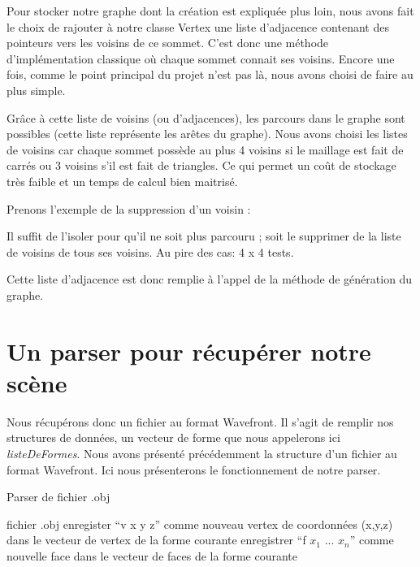 \documentclass[a4paper,12pt]{report}
\begin{document}
Pour stocker notre graphe dont la création est expliquée plus loin, nous avons fait le choix de rajouter à notre classe Vertex une liste d'adjacence contenant des pointeurs vers les voisins de ce sommet. C'est donc une méthode d'implémentation classique où chaque sommet connait ses voisins. Encore une fois, comme le point principal du projet n'est pas là, nous avons choisi de faire au plus simple. 

Grâce à cette liste de voisins (ou d'adjacences), les parcours dans le graphe sont possibles (cette liste représente les arêtes du graphe). Nous avons choisi les listes de voisins car chaque sommet possède au plus 4 voisins si le maillage est fait de carrés ou 3 voisins s'il est fait de triangles. Ce qui permet un coût de stockage très faible et un temps de calcul bien maitrisé. 

Prenons l'exemple de la suppression d'un voisin :

Il suffit de l'isoler pour qu'il ne soit plus parcouru ; soit le supprimer de la liste de voisins de tous ses voisins. Au pire des cas: 4 x 4 tests.
 
Cette liste d'adjacence est donc remplie à l'appel de la méthode de génération du graphe.

\section{Un parser pour récupérer notre scène}

Nous récupérons donc un fichier au format Wavefront. Il s'agit de remplir nos structures de données, un vecteur de forme que nous appelerons ici \textit{listeDeFormes}.
Nous avons présenté précédemment la structure d'un fichier au format Wavefront. Ici nous présenterons le fonctionnement de notre parser.

\begin{algorithm}[h]
\caption{Parser de fichier .obj}
\label{parser}
\begin{algorithmic}[1]
\REQUIRE fichier .obj
    \STATE enregister ``v x y z'' comme nouveau vertex de coordonnées (x,y,z) dans le vecteur de vertex de la forme courante
  \ELSE
    \STATE enregistrer ``f $x_{1}$ ... $x_{n}$'' comme nouvelle face dans le vecteur de faces de la forme courante
    \ENDIF
  \ENDIF
\ENDFOR
\end{algorithmic}
\end{algorithm}
\end{document}
